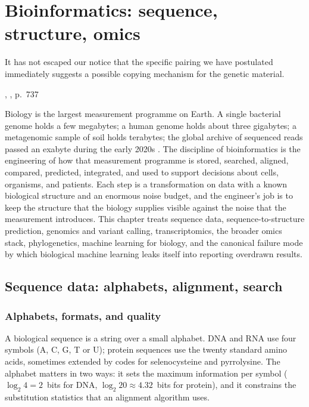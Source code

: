 \chapter{Bioinformatics: sequence, structure, omics}
\label{vol06:ch11}

\epigraph{It has not escaped our notice that the specific pairing we
have postulated immediately suggests a possible copying mechanism for
the genetic material.}{\citeauthor{paper:v6c11-watson-crick-1953},
, p.~737}


\noindent
Biology is the largest measurement programme on Earth. A single bacterial
genome holds a few megabytes; a human genome holds about three gigabytes;
a metagenomic sample of soil holds terabytes; the global archive of
sequenced reads passed an exabyte during the early 2020s
\cite{paper:v6c11-stephens-genomic-2015}. The discipline of bioinformatics
is the engineering of how that measurement programme is stored,
searched, aligned, compared, predicted, integrated, and used to support
decisions about cells, organisms, and patients. Each step is a transformation
on data with a known biological structure and an enormous noise budget,
and the engineer's job is to keep the structure that the biology supplies
visible against the noise that the measurement introduces. This chapter
treats sequence data, sequence-to-structure prediction, genomics and
variant calling, transcriptomics, the broader omics stack, phylogenetics,
machine learning for biology, and the canonical failure mode by which
biological machine learning leaks itself into reporting overdrawn results.

\section{Sequence data: alphabets, alignment, search}

\subsection{Alphabets, formats, and quality}

A biological sequence is a string over a small alphabet. DNA and RNA use
four symbols (A, C, G, T or U); protein sequences use the twenty
standard amino acids, sometimes extended by codes for selenocysteine
and pyrrolysine. The alphabet matters in two ways: it sets the maximum
information per symbol ($\log_2 4 = 2$~bits for DNA, $\log_2 20
\approx 4.32$~bits for protein), and it constrains the substitution
statistics that an alignment algorithm uses.

